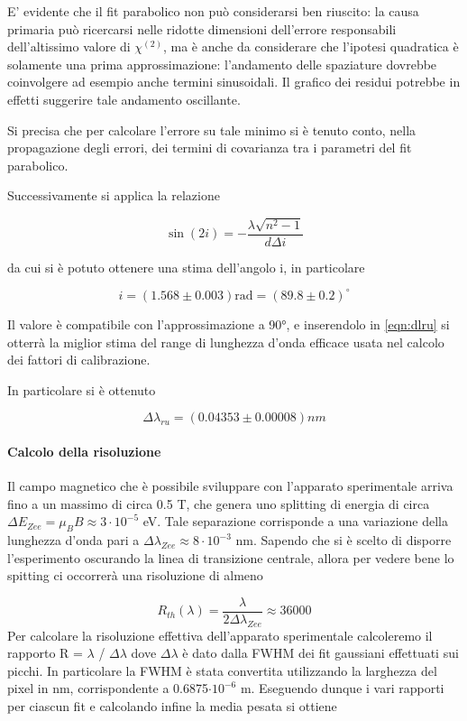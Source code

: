 \documentclass{article}
\begin{document}
	E' evidente che il fit parabolico non può considerarsi ben riuscito: la causa primaria
	può ricercarsi nelle ridotte dimensioni dell'errore responsabili dell'altissimo valore
	di $\chi^{(2)}$, ma è anche da considerare che l'ipotesi quadratica è solamente una 
	prima approssimazione: l'andamento delle spaziature dovrebbe coinvolgere ad esempio 
	anche termini sinusoidali. Il grafico dei residui potrebbe in effetti suggerire tale 
	andamento oscillante.
	

	Si precisa che per calcolare l'errore su tale 
	minimo si è tenuto conto, nella propagazione degli errori, dei termini di 
	covarianza tra i parametri del fit parabolico.
	
	Successivamente si applica la relazione

	\begin{equation}
		\sin(2i) = - \frac{\lambda \sqrt{n^2-1}}{d \Delta i}
	\end{equation}

	da cui si è potuto ottenere una stima dell'angolo i, in particolare

	\[
		i = (1.568 \pm 0.003)\text{rad} = ( 89.8 \pm 0.2 ) ^{\circ}
	\]

	Il valore è compatibile con l'approssimazione a 90°, e inserendolo in \ref{eqn:dlru}
	si otterrà la miglior stima del range di lunghezza d'onda efficace usata
	nel calcolo dei fattori di calibrazione.

	In particolare si è ottenuto

	\[
		\Delta\lambda_{ru} = (0.04353 \pm 0.00008) nm 
	\]	


	\paragraph{Calcolo della risoluzione}

	Il campo magnetico che è possibile sviluppare con l'apparato sperimentale
	arriva fino a un massimo di circa 0.5 T, che genera uno splitting
	di energia di circa $\Delta E_{Zee} = \mu_B B \approx 3\cdot 10^{-5}$ eV.
	Tale separazione corrisponde a una variazione della lunghezza d'onda
	pari a $\Delta \lambda_{Zee} \approx 8 \cdot 10^{-3}$ nm. Sapendo che 
	si è scelto di disporre l'esperimento oscurando la linea di transizione
	centrale, allora per vedere bene lo spitting ci occorrerà una risoluzione
	di almeno

	\[
		R_{th}(\lambda) = \frac{\lambda}{2\Delta\lambda_{Zee}}	\approx 36000
	\]
	Per calcolare la risoluzione effettiva dell'apparato sperimentale
	calcoleremo il rapporto R = $\lambda$ / $\Delta\lambda$ dove 
	$\Delta\lambda$ è dato dalla FWHM dei fit gaussiani effettuati sui 
	picchi. In particolare la FWHM è stata convertita utilizzando la 
	larghezza del pixel in nm, corrispondente a 0.6875$\cdot 10^{-6}$ m.
	Eseguendo dunque i vari rapporti per ciascun fit e calcolando infine
	la media pesata si ottiene
\end{document}
